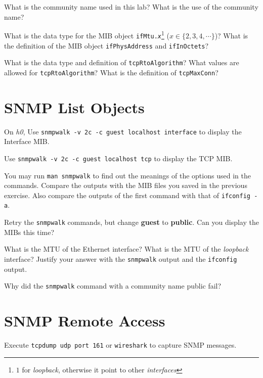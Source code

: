 \documentclass{../UTNetLab}
\begin{document}
    \begin{report}
    \item What is the community name used in this lab? What is the use of the
    community name?
    
    \item What is the data type for the MIB object \texttt{ifMtu.\textit{x}}\footnote{$1$ for \textit{loopback}, otherwise it point to other \textit{interfaces}} ($x \in \{2,3,4,\cdots\}$)? What is the definition of the MIB object \texttt{ifPhysAddress} and \texttt{ifInOctets}?
    
    \item What is the data type and definition of \texttt{tcpRtoAlgorithm}? What values are allowed for \texttt{tcpRtoAlgorithm}? What is the definition of \texttt{tcpMaxConn}?
    \end{report}

\section{SNMP List Objects}
    On \textit{h0},
    Use \lstinline[emph=guest]{snmpwalk -v 2c -c guest localhost interface} to display the Interface MIB.

    Use \lstinline[emph=guest]{snmpwalk -v 2c -c guest localhost tcp} to display the TCP MIB.

    You may run \lstinline{man snmpwalk} to find out the meanings of the options used in the commands.
    Compare the outputs with the MIB files you saved in the previous exercise.
    Also compare the outputs of the first command with that of \lstinline{ifconfig -a}.

    Retry the \lstinline{snmpwalk} commands, but change \textbf{guest} to \textbf{public}.
    Can you display the MIBs this time?
    
    \begin{report}
    \item What is the MTU of the Ethernet interface? What is the MTU of the \textit{loopback} interface? Justify your answer with the \lstinline{snmpwalk} output and the \lstinline{ifconfig} output.
    
    \item Why did the \lstinline{snmpwalk} command with a community name public fail?
    \end{report}

\section{SNMP Remote Access}
    Execute \lstinline{tcpdump udp port 161} or \lstinline{wireshark} to capture SNMP messages.
\end{document}

